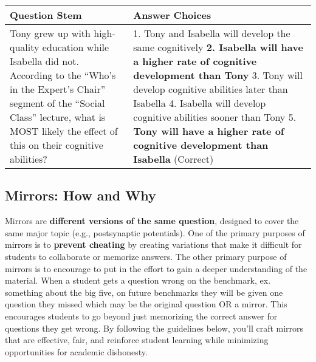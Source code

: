 \documentclass[
]{article}
\begin{document}
\begin{longtable}[]{@{}ll@{}}
\toprule
\begin{minipage}[b]{0.30\columnwidth}\raggedright
\textbf{Question Stem}\strut
\end{minipage} & \begin{minipage}[b]{0.64\columnwidth}\raggedright
\textbf{Answer Choices}\strut
\end{minipage}\tabularnewline
\midrule
\endhead
\begin{minipage}[t]{0.30\columnwidth}\raggedright
Tony grew up with high-quality education while Isabella did not. According to the ``Who's in the Expert's Chair'' segment of the ``Social Class'' lecture, what is MOST likely the effect of this on their cognitive abilities?\strut
\end{minipage} & \begin{minipage}[t]{0.64\columnwidth}\raggedright
1. Tony and Isabella will develop the same cognitively \textbf{2. Isabella will have a higher rate of cognitive development than Tony} 3. Tony will develop cognitive abilities later than Isabella 4. Isabella will develop cognitive abilities sooner than Tony 5. \textbf{Tony will have a higher rate of cognitive development than Isabella} (Correct)\strut
\end{minipage}\tabularnewline
\bottomrule
\end{longtable}

\hypertarget{mirrors-how-and-why}{%
\subsection{Mirrors: How and Why}\label{mirrors-how-and-why}}

Mirrors are \textbf{different versions of the same question}, designed to cover the same major topic (e.g., postsynaptic potentials). One of the primary purposes of mirrors is to \textbf{prevent cheating} by creating variations that make it difficult for students to collaborate or memorize answers. The other primary purpose of mirrors is to encourage to put in the effort to gain a deeper understanding of the material. When a student gets a question wrong on the benchmark, ex. something about the big five, on future benchmarks they will be given one question they missed which may be the original question OR a mirror. This encourages students to go beyond just memorizing the correct answer for questions they get wrong. By following the guidelines below, you'll craft mirrors that are effective, fair, and reinforce student learning while minimizing opportunities for academic dishonesty.
\end{document}
